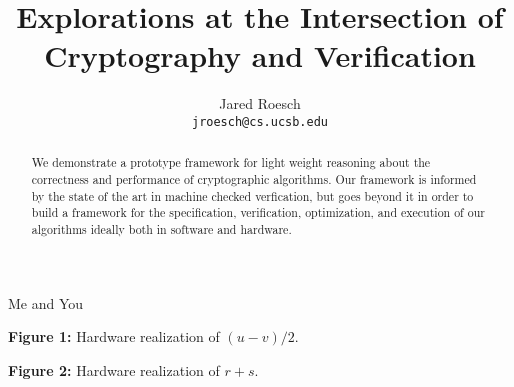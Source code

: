 \documentclass[twocolumn]{IEEEtran}
\begin{document}
\title{Explorations at the Intersection of Cryptography and Verification}

\author{Jared Roesch \\ \texttt{jroesch@cs.ucsb.edu}}

{Me and You}

\maketitle

\begin{abstract}
We demonstrate a prototype framework for light weight reasoning about the
correctness and performance of cryptographic algorithms. Our framework is informed
by the state of the art in machine checked verfication, but goes beyond it in
order to build a framework for the specification, verification, optimization,
and execution of our algorithms ideally both in software and hardware.
\end{abstract}







\bigskip
\bigskip

\centerline{\textbf{Figure 1:} Hardware realization of $(u-v)/2$.}
\medskip
\epsfxsize=3.1in
\centerline{}

\bigskip
\bigskip

\centerline{\textbf{Figure 2:} Hardware realization of $r+s$.}
\medskip
\epsfxsize=3.1in
\centerline{}



\end{document}
